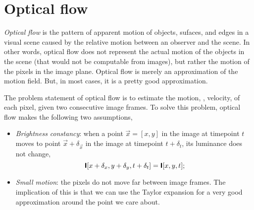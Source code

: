\section{Optical flow}

\textit{Optical flow} is the pattern of apparent motion of objects, sufaces,
and edges in a visual scene caused by the relative motion between an observer
and the scene. In other words, optical flow does
not represent the actual motion of the objects in the scene (that would not be
computable from images), but rather the motion of the pixels in the image
plane. Optical flow is merely an approximation of the motion field. But, in
most cases, it is a pretty good approximation.

The problem statement of optical flow is to estimate the motion, \ie, velocity,
of each pixel, given two consecutive image frames. To solve this problem,
optical flow makes the following two assumptions,
\begin{itemize}
  \item \textit{Brightness constancy}: when a point $\vec{x}=[x, y]$ in the
    image at timepoint $t$ moves to point $\vec{x}+\delta_{\vec{x}}$ in the
    image at timepoint $t+\delta_t$, its luminance does not change, \[
      \bm{\mathsf{I}}[x+\delta_x,y+\delta_y,t+\delta_t] = \bm{\mathsf{I}}[x,y,t]
    ;\]
  \item \textit{Small motion}: the pixels do not move far between image frames.
    The implication of this is that we can use the Taylor expansion for a very
    good approximation around the point we care about.
\end{itemize}

